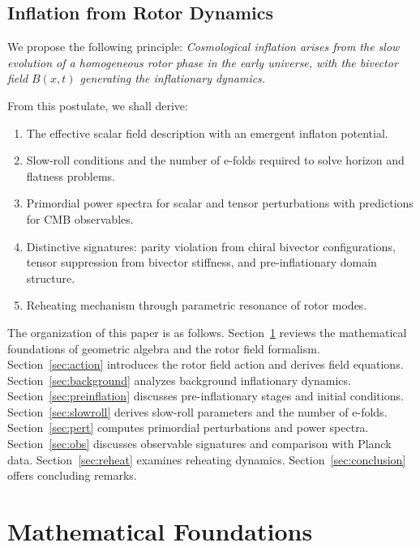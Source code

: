 \documentclass[11pt,a4paper]{article}
\numberwithin{equation}{section}
\theoremstyle{plain}
\theoremstyle{definition}
\theoremstyle{remark}
\begin{document}
\subsection{Inflation from Rotor Dynamics}

We propose the following principle: \emph{Cosmological inflation arises from the slow evolution of a homogeneous rotor phase in the early universe, with the bivector field $B(x,t)$ generating the inflationary dynamics.}

From this postulate, we shall derive:

\begin{enumerate}
  \item The effective scalar field description with an emergent inflaton potential.
  \item Slow-roll conditions and the number of e-folds required to solve horizon and flatness problems.
  \item Primordial power spectra for scalar and tensor perturbations with predictions for CMB observables.
  \item Distinctive signatures: parity violation from chiral bivector configurations, tensor suppression from bivector stiffness, and pre-inflationary domain structure.
  \item Reheating mechanism through parametric resonance of rotor modes.
\end{enumerate}

The organization of this paper is as follows. Section~\ref{sec:prelim} reviews the mathematical foundations of geometric algebra and the rotor field formalism. Section~\ref{sec:action} introduces the rotor field action and derives field equations. Section~\ref{sec:background} analyzes background inflationary dynamics. Section~\ref{sec:preinflation} discusses pre-inflationary stages and initial conditions. Section~\ref{sec:slowroll} derives slow-roll parameters and the number of e-folds. Section~\ref{sec:pert} computes primordial perturbations and power spectra. Section~\ref{sec:obs} discusses observable signatures and comparison with Planck data. Section~\ref{sec:reheat} examines reheating dynamics. Section~\ref{sec:conclusion} offers concluding remarks.

\section{Mathematical Foundations}
\label{sec:prelim}
\end{document}
